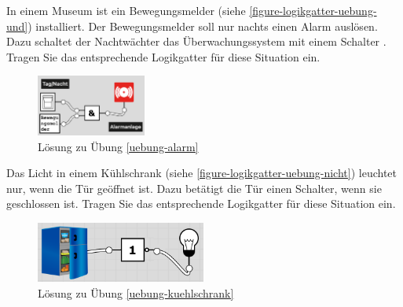 \begin{exercise}\label{uebung-alarm}
In einem Museum ist ein Bewegungsmelder (siehe \autoref{figure-logikgatter-uebung-und}) installiert. Der Bewegungsmelder soll nur nachts einen Alarm auslösen. Dazu schaltet der Nachtwächter das Überwachungssystem mit einem Schalter . Tragen Sie das entsprechende Logikgatter für diese Situation ein.
\end{exercise}
\begin{solution}
\begin{figure}[htb]
\centering
\includegraphics[height=2cm]{uebungen/logikgatter_uebung_und_loesung}
\caption{Lösung zu Übung \ref{uebung-alarm}}
\label{figure-logikgatter-uebung-und-loesung}
\end{figure}
\end{solution}

\begin{exercise}\label{uebung-kuehlschrank}
Das Licht in einem Kühlschrank (siehe \autoref{figure-logikgatter-uebung-nicht}) leuchtet nur, wenn die Tür geöffnet ist. Dazu betätigt die Tür einen Schalter, wenn sie geschlossen ist. Tragen Sie das entsprechende Logikgatter für diese Situation ein.
\end{exercise}
\begin{solution}
\begin{figure}[htb]
\centering
\includegraphics[height=2cm]{uebungen/logikgatter_uebung_nicht_loesung}
\caption{Lösung zu Übung \ref{uebung-kuehlschrank}}
\label{figure-logikgatter-uebung-nicht-loesung}
\end{figure}
\end{solution}

